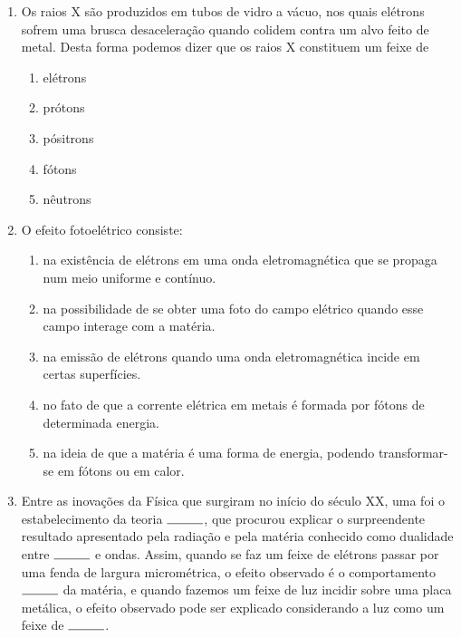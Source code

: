 \documentclass[12pt,letterpaper,fleqn]{article}
\begin{document}
\begin{enumerate}
    \item Os raios X são produzidos em tubos de vidro a vácuo, nos quais elétrons sofrem uma brusca desaceleração quando colidem contra um alvo feito de metal. Desta forma podemos dizer que os raios X constituem um feixe de
    \begin{enumerate}
        \item elétrons
        \item prótons
        \item pósitrons
        \item fótons
        \item nêutrons
    \end{enumerate}
    
    \item O efeito fotoelétrico consiste:
    \begin{enumerate}
        \item  na existência de elétrons em uma onda eletromagnética que se propaga num meio uniforme e contínuo.

\item na possibilidade de se obter uma foto do campo elétrico quando esse campo interage com a matéria.

\item na emissão de elétrons quando uma onda eletromagnética incide em certas superfícies.

\item no fato de que a corrente elétrica em metais é formada por fótons de determinada energia.

\item na ideia de que a matéria é uma forma de energia, podendo transformar-se em fótons ou em calor.
    \end{enumerate}
    
    \item Entre as inovações da Física que surgiram no início do século XX, uma foi o estabelecimento da teoria $\rule{1cm}{0.15mm}$, que procurou explicar o surpreendente resultado apresentado pela radiação e pela matéria conhecido como dualidade entre $\rule{1cm}{0.15mm}$ e ondas. Assim, quando se faz um feixe de elétrons passar por uma fenda de largura micrométrica, o efeito observado é o comportamento $\rule{1cm}{0.15mm}$ da matéria, e quando fazemos um feixe de luz incidir sobre uma placa metálica, o efeito observado pode ser explicado considerando a luz como um feixe de $\rule{1cm}{0.15mm}$.


\end{enumerate}
\end{document}
